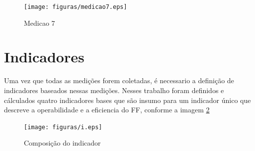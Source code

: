 \begin{figure}[H]
  \centering
  \label{fig:indicadores}
  \texttt{[image: figuras/medicao7.eps]}
  \caption{Medicao 7}
\end{figure}

\section{Indicadores}

Uma vez que todas as medições forem coletadas, é necessario a definição de indicadores baseados nessas medições.
Nesses trabalho foram definidos e cálculados quatro indicadores bases que são insumo para um indicador único que descreve
a operabilidade e a eficiencia do FF, conforme a imagem \ref{fig:indicadores}

\begin{figure}[H]
  \centering
  \label{fig:indicadores}
  \texttt{[image: figuras/i.eps]}
  \caption{Composição do indicador}
\end{figure}
